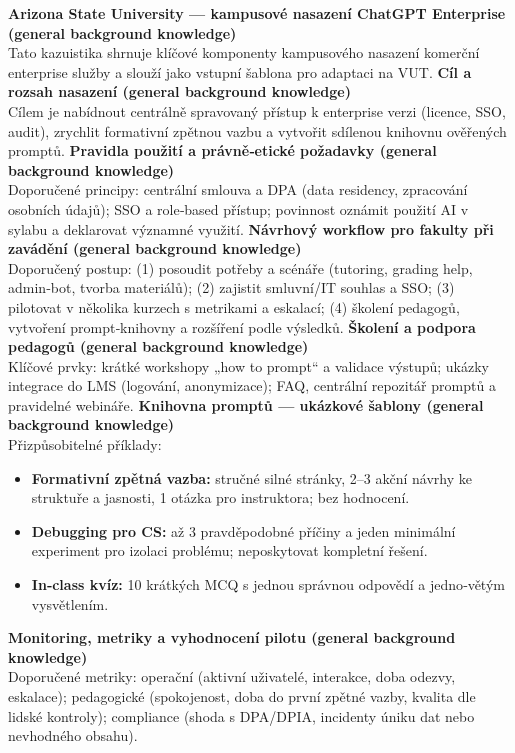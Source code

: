\documentclass{report}%
\begin{document}
%
\medskip
\textbf{Arizona State University — kampusové nasazení ChatGPT Enterprise (general background knowledge)}\\
Tato kazuistika shrnuje klíčové komponenty kampusového nasazení komerční enterprise služby a slouží jako vstupní šablona pro adaptaci na VUT.
\medskip
\textbf{Cíl a rozsah nasazení (general background knowledge)}\\
Cílem je nabídnout centrálně spravovaný přístup k enterprise verzi (licence, SSO, audit), zrychlit formativní zpětnou vazbu a vytvořit sdílenou knihovnu ověřených promptů.
\medskip
\textbf{Pravidla použití a právně‑etické požadavky (general background knowledge)}\\
Doporučené principy: centrální smlouva a DPA (data residency, zpracování osobních údajů); SSO a role‑based přístup; povinnost oznámit použití AI v sylabu a deklarovat významné využití.
\medskip
\textbf{Návrhový workflow pro fakulty při zavádění (general background knowledge)}\\
Doporučený postup: (1) posoudit potřeby a scénáře (tutoring, grading help, admin‑bot, tvorba materiálů); (2) zajistit smluvní/IT souhlas a SSO; (3) pilotovat v několika kurzech s metrikami a eskalací; (4) školení pedagogů, vytvoření prompt‑knihovny a rozšíření podle výsledků.
\medskip
\textbf{Školení a podpora pedagogů (general background knowledge)}\\
Klíčové prvky: krátké workshopy „how to prompt“ a validace výstupů; ukázky integrace do LMS (logování, anonymizace); FAQ, centrální repozitář promptů a pravidelné webináře.
\medskip
\textbf{Knihovna promptů — ukázkové šablony (general background knowledge)}\\
Přizpůsobitelné příklady: \\
\begin{itemize}
  \item \textbf{Formativní zpětná vazba:} stručné silné stránky, 2–3 akční návrhy ke struktuře a jasnosti, 1 otázka pro instruktora; bez hodnocení.
  \item \textbf{Debugging pro CS:} až 3 pravděpodobné příčiny a jeden minimální experiment pro izolaci problému; neposkytovat kompletní řešení.
  \item \textbf{In‑class kvíz:} 10 krátkých MCQ s jednou správnou odpovědí a jedno‑větým vysvětlením.
\end{itemize}
\medskip
\textbf{Monitoring, metriky a vyhodnocení pilotu (general background knowledge)}\\
Doporučené metriky: operační (aktivní uživatelé, interakce, doba odezvy, eskalace); pedagogické (spokojenost, doba do první zpětné vazby, kvalita dle lidské kontroly); compliance (shoda s DPA/DPIA, incidenty úniku dat nebo nevhodného obsahu).
\end{document}
